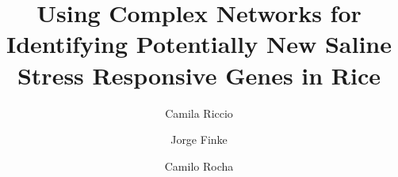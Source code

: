 \documentclass[runningheads]{llncs}
\begin{document}
%
\title{Using Complex Networks for Identifying Potentially New Saline
  Stress Responsive Genes in Rice}
%
\author{Camila Riccio \and Jorge Finke \and Camilo Rocha}


%
\maketitle















\end{document}
